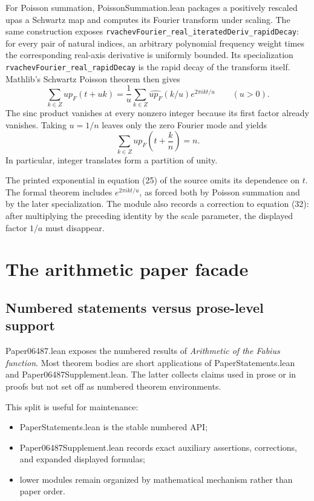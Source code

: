 \documentclass[11pt,a4paper,openany]{book}
\def\module#1{#1.lean}
\def\upfun{up}
\def\Z{Z}
\newcommand{\Z}{\ensuremath{\mathbb{Z}}}
\newcommand{\upfun}{\ensuremath{\operatorname{up}}}
\newcommand{\module}[1]{\nolinkurl{#1.lean}}
\newcommand{\pathbreak}[1]{\nolinkurl{#1}}
\begin{document}
For Poisson summation, \module{PoissonSummation} packages a positively rescaled
\upfun as a Schwartz map and computes its Fourier transform under scaling.
The same construction exposes
\pathbreak{rvachevFourier_real_iteratedDeriv_rapidDecay}: for every pair of
natural indices, an arbitrary polynomial frequency weight times the
corresponding real-axis derivative is uniformly bounded.  Its specialization
\pathbreak{rvachevFourier_real_rapidDecay} is the rapid decay of the transform
itself.
Mathlib's Schwartz Poisson theorem then gives
\[
 \sum_{k\in\Z}\upfun_F(t+uk)
 =\frac1u\sum_{k\in\Z}
   \widehat{\upfun_F}(k/u)
   e^{2\pi i k t/u}
 \qquad(u>0).
\]
The sinc product vanishes at every nonzero integer because its first factor
already vanishes.  Taking $u=1/n$ leaves only the zero Fourier mode and yields
\[
 \sum_{k\in\Z}\upfun_F\left(t+\frac{k}{n}\right)=n.
\]
In particular, integer translates form a partition of unity.

\begin{correction}
The printed exponential in equation (25) of the source omits its dependence on
$t$.  The formal theorem includes
$e^{2\pi i k t/u}$, as forced both by Poisson summation and by the later
specialization.  The module also records a correction to equation (32): after
multiplying the preceding identity by the scale parameter, the displayed
factor $1/a$ must disappear.
\end{correction}

\chapter{The arithmetic paper facade}
\label{ch:paper06487}

\section{Numbered statements versus prose-level support}
\module{Paper06487} exposes the numbered results of
\emph{Arithmetic of the Fabius function}.  Most theorem bodies are short
applications of \module{PaperStatements} and
\module{Paper06487Supplement}.  The latter collects claims used in prose or in
proofs but not set off as numbered theorem environments.

This split is useful for maintenance:
\begin{itemize}
  \item \module{PaperStatements} is the stable numbered API;
  \item \module{Paper06487Supplement} records exact auxiliary assertions,
        corrections, and expanded displayed formulas;
  \item lower modules remain organized by mathematical mechanism rather than
        paper order.
\end{itemize}
\end{document}
